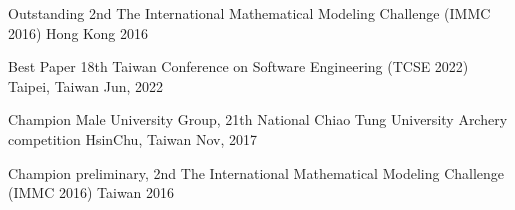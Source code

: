 



\begin{cvhonors}


  \cvhonor
    {Outstanding} %
    {2nd The International Mathematical Modeling Challenge (IMMC 2016) } %
    {Hong Kong} %
    {2016} %

\end{cvhonors}




\begin{cvhonors}

  \cvhonor
    {Best Paper} %
    {18th Taiwan Conference on Software Engineering (TCSE 2022)} %
    {Taipei, Taiwan} %
    {Jun, 2022} %

  \cvhonor
    {Champion} %
    {Male University Group, 21th National Chiao Tung University Archery competition} %
    {HsinChu, Taiwan} %
    {Nov, 2017} %

  \cvhonor
    {Champion} %
    {preliminary, 2nd The International Mathematical Modeling Challenge (IMMC 2016) } %
    {Taiwan} %
    {2016} %



\end{cvhonors}
